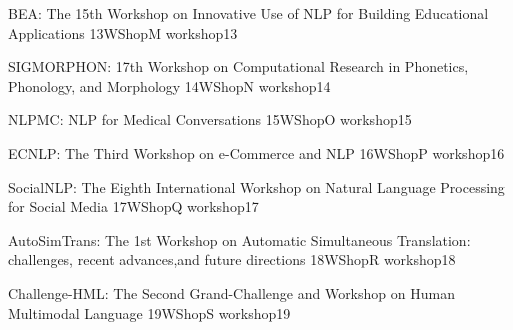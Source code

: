 \begin{wsschedule}
    {BEA: The 15th Workshop on Innovative Use of NLP for Building Educational Applications}
    {13}{WShopM}
    {workshop13}
    {\WShopLocM}
    
\end{wsschedule}

\begin{wsschedule}
    {SIGMORPHON: 17th Workshop on Computational Research in Phonetics, Phonology, and Morphology}
    {14}{WShopN}
    {workshop14}
    {\WShopLocN}
    
\end{wsschedule}

\begin{wsschedule}
    {NLPMC: NLP for Medical Conversations}
    {15}{WShopO}
    {workshop15}
    {\WShopLocO}
    
\end{wsschedule}

\begin{wsschedule}
    {ECNLP: The Third Workshop on e-Commerce and NLP}
    {16}{WShopP}
    {workshop16}
    {\WShopLocP}
    
\end{wsschedule}

\begin{wsschedule}
    {SocialNLP: The Eighth International Workshop on Natural Language Processing for Social Media}
    {17}{WShopQ}
    {workshop17}
    {\WShopLocQ}
    
\end{wsschedule}

\begin{wsschedule}
    {AutoSimTrans: The 1st Workshop on Automatic Simultaneous Translation: challenges, recent advances,and future directions}
    {18}{WShopR}
    {workshop18}
    {\WShopLocR}
    
\end{wsschedule}

\begin{wsschedule}
    {Challenge-HML: The Second Grand-Challenge and Workshop on Human Multimodal Language}
    {19}{WShopS}
    {workshop19}
    {\WShopLocS}
    
\end{wsschedule}

